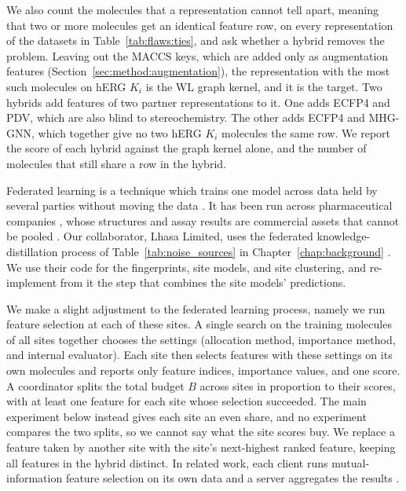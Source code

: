 We also count the molecules that a representation cannot tell apart, meaning that two or more molecules get an identical feature row, on every representation of the datasets in Table~\ref{tab:flaws:ties}, and ask whether a hybrid removes the problem. Leaving out the MACCS keys, which are added only as augmentation features (Section~\ref{sec:method:augmentation}), the representation with the most such molecules on hERG $K_i$ is the WL graph kernel, and it is the target. Two hybrids add features of two partner representations to it. One adds ECFP4 and PDV, which are also blind to stereochemistry. The other adds ECFP4 and MHG-GNN, which together give no two hERG $K_i$ molecules the same row. We report the score of each hybrid against the graph kernel alone, and the number of molecules that still share a row in the hybrid.

Federated learning is a technique which trains one model across data held by several parties without moving the data \citep{McMahan2017}. It has been run across pharmaceutical companies \citep{Heyndrickx2024}, whose structures and assay results are commercial assets that cannot be pooled \citep{Hanser2023,Bassani2023}. Our collaborator, Lhasa Limited, uses the federated knowledge-distillation process of Table~\ref{tab:noise_sources} in Chapter~\ref{chap:background} \citep{Hanser2025}. We use their code for the fingerprints, site models, and site clustering, and re-implement from it the step that combines the site models' predictions.

We make a slight adjustment to the federated learning process, namely we run feature selection at each of these sites. A single search on the training molecules of all sites together chooses the settings (allocation method, importance method, and internal evaluator). Each site then selects features with these settings on its own molecules and reports only feature indices, importance values, and one score. A coordinator splits the total budget $B$ across sites in proportion to their scores, with at least one feature for each site whose selection succeeded. The main experiment below instead gives each site an even share, and no experiment compares the two splits, so we cannot say what the site scores buy. We replace a feature taken by another site with the site's next-highest ranked feature, keeping all features in the hybrid distinct. In related work, each client runs mutual-information feature selection on its own data and a server aggregates the results \citep{Cassara2022}.

